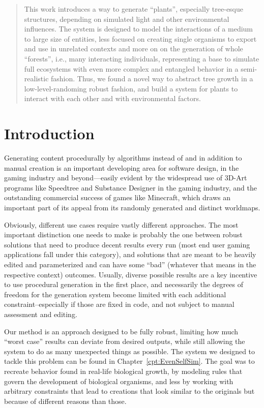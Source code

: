 \documentclass[11pt, abstract=on]{scrartcl}
\begin{document}
\begin{abstract}

This work introduces a way to generate ``plants'', especially tree-esque structures, depending on simulated light and other environmental influences. The system is designed to model the interactions of a medium to large size of entities, less focused on creating single organisms to export and use in unrelated contexts and more on on the generation of whole ``forests'', i.e., many interacting individuals, representing a base to simulate full ecosystems with even more complex and entangled behavior in a semi-realistic fashion. Thus, we found a novel way to abstract tree growth in a low-level-randoming robust fashion, and build a system for plants to interact with each other and with environmental factors.
\end{abstract}

\section{Introduction}
Generating content procedurally by algorithms instead of and in addition to manual creation is an important developing area for software design, in the gaming industry and beyond---easily evident by the widespread use of 3D-Art programs like Speedtree and Substance Designer in the gaming industry, and the outstanding commercial success of games like Minecraft, which draws an important part of its appeal from its randomly generated and distinct worldmaps.

Obviously, different use cases require vastly different approaches. The most important distinction one needs to make is probably the one between robust solutions that need to produce decent results every run (most end user gaming applications fall under this category), and solutions that are meant to be heavily edited and parameterized and can have some ``bad'' (whatever that means in the respective context) outcomes. Usually, diverse possible results are a key incentive to use procedural generation in the first place, and necessarily the degrees of freedom for the generation system become limited with each additional constraint--especially if those are fixed in code, and not subject to manual assessment and editing.

Our method is an approach designed to be fully robust, limiting how much ``worst case'' results can deviate from desired outputs, while still allowing the system to do as many unexpected things as possible. The system we designed to tackle this problem can be found in Chapter~\ref{cpt:EvenSelfSim}. The goal was to recreate behavior found in real-life biological growth, by modeling rules that govern the development of biological organisms, and less by working with arbitrary constraints that lead to creations that look similar to the originals but because of different reasons than those.
\end{document}
